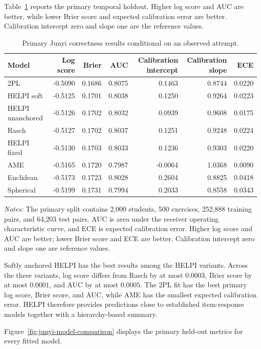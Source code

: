 \documentclass[
  12pt]{article}
\newcommand{\TableNote}[1]{%
  \par\vspace{0.35em}\noindent
  \begin{minipage}{0.96\linewidth}
    \footnotesize\setstretch{1.05}\raggedright
    \textit{Notes:} #1
  \end{minipage}%
  \par\vspace{0.6\baselineskip}%
}
\theoremstyle{definition}
\theoremstyle{plain}
\begin{document}
Table~\ref{tab:junyi-primary} reports the primary temporal holdout. Higher log score and AUC are better, while lower Brier score and expected calibration error are better. Calibration intercept zero and slope one are the reference values.

\begin{table}[H]
	\centering
	\scriptsize
	\caption{Primary Junyi correctness results conditional on an observed attempt.}
	\label{tab:junyi-primary}
	\begin{tabular}{lrrrrrr}
		\toprule
		Model & Log score & Brier & AUC & Calibration intercept & Calibration slope & ECE \\
		\midrule
		2PL & -0.5090 & 0.1686 & 0.8075 & 0.1463 & 0.8744 & 0.0220 \\
		HELPI soft & -0.5125 & 0.1701 & 0.8038 & 0.1250 & 0.9264 & 0.0223 \\
		HELPI unanchored & -0.5126 & 0.1702 & 0.8032 & 0.0939 & 0.9608 & 0.0175 \\
		Rasch & -0.5127 & 0.1702 & 0.8037 & 0.1251 & 0.9248 & 0.0224 \\
		HELPI fixed & -0.5130 & 0.1703 & 0.8033 & 0.1236 & 0.9303 & 0.0220 \\
		AME & -0.5165 & 0.1720 & 0.7987 & -0.0064 & 1.0368 & 0.0090 \\
		Euclidean & -0.5173 & 0.1723 & 0.8028 & 0.2604 & 0.8825 & 0.0418 \\
		Spherical & -0.5199 & 0.1731 & 0.7994 & 0.2033 & 0.8558 & 0.0343 \\
		\bottomrule
	\end{tabular}
	\TableNote{The primary split contains 2,000 students, 500 exercises, 252,888 training pairs, and 64,203 test pairs. AUC is area under the receiver operating characteristic curve, and ECE is expected calibration error. Higher log score and AUC are better; lower Brier score and ECE are better. Calibration intercept zero and slope one are reference values.}
\end{table}

Softly anchored HELPI has the best results among the HELPI variants. Across the three variants, log score differs from Rasch by at most $0.0003$, Brier score by at most $0.0001$, and AUC by at most $0.0005$. The 2PL fit has the best primary log score, Brier score, and AUC, while AME has the smallest expected calibration error. HELPI therefore provides predictions close to established item-response models together with a hierarchy-based summary.

Figure~\ref{fig:junyi-model-comparison} displays the primary held-out metrics for every fitted model.
\end{document}

